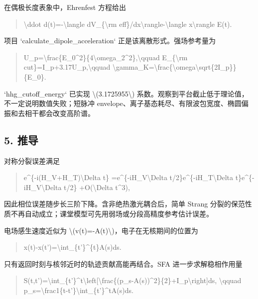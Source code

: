 \documentclass[UTF8,openany,11pt,fontset=fandol]{ctexbook}
\begin{document}
在偶极长度表象中，Ehrenfest 方程给出

\begin{quote}
\textbackslash ddot d(t)=-\textbackslash langle dV\_\{\textbackslash rm
eff\}/dx\textbackslash rangle-\textbackslash langle
x\textbackslash rangle E(t).
\end{quote}

项目 `calculate\_dipole\_acceleration` 正是该离散形式。强场参考量为

\begin{quote}
U\_p=\textbackslash frac\{E\_0\^{}2\}\{4\textbackslash omega\_2\^{}2\},\textbackslash qquad
E\_\{\textbackslash rm cut\}=I\_p+3.17U\_p,\textbackslash qquad
\textbackslash gamma\_K=\textbackslash frac\{\textbackslash omega\textbackslash sqrt\{2I\_p\}\}\{E\_0\}.
\end{quote}

`hhg\_cutoff\_energy` 已实现 \textbackslash(3.1725955\textbackslash)
系数。观察到平台截止低于理论值，不一定说明数值失败；短脉冲
envelope、离子基态耗尽、有限波包宽度、椭圆偏振和去相干都会改变高阶谱。

\subsection{\texorpdfstring{\textbf{5.
推导}}{5. 推导}}\label{ux63a8ux5bfc-1}

对称分裂误差满足

\begin{quote}
e\^{}\{-i(H\_V+H\_T)\textbackslash Delta t\}
=e\^{}\{-iH\_V\textbackslash Delta
t/2\}e\^{}\{-iH\_T\textbackslash Delta
t\}e\^{}\{-iH\_V\textbackslash Delta t/2\} +O(\textbackslash Delta
t\^{}3),
\end{quote}

因此相位误差随步长三阶下降。含非绝热激光耦合后，简单 Strang
分裂的保范性质不再自动成立；课堂模型可先用弱场或分段高精度参考估计误差。

电场感生速度近似为
\textbackslash(v(t)=-A(t)\textbackslash)，电子在无核期间的位置为

\begin{quote}
x(t)-x(t')=\textbackslash int\_\{t'\}\^{}\{t\}A(s)ds.
\end{quote}

只有返回时刻与核邻近时的轨迹贡献高能再结合。SFA 进一步求解稳相作用量

\begin{quote}
S(t,t')=\textbackslash int\_\{t'\}\^{}t\textbackslash left{[}\textbackslash frac\{(p\_s-A(s))\^{}2\}\{2\}+I\_p\textbackslash right{]}ds,
\textbackslash qquad
p\_s=\textbackslash frac1\{t-t'\}\textbackslash int\_\{t'\}\^{}tA(s)ds.
\end{quote}
\end{document}
